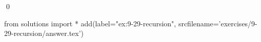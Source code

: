 
\begin{ex}
  \label{ex:9-29-recursion}
  
  \qed
\end{ex}
\begin{python0}
from solutions import *
add(label="ex:9-29-recursion",
    srcfilename='exercises/9-29-recursion/answer.tex')
\end{python0}
